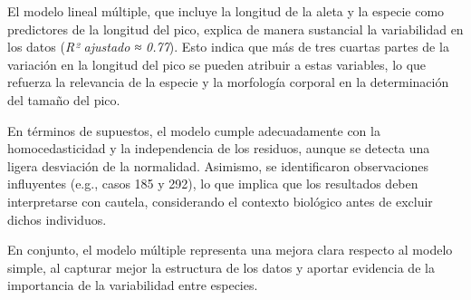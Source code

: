 \documentclass[
  spanish,
  11pt,
  a4paper,
  DIV=11,
  numbers=noendperiod]{scrartcl}
\begin{document}
El modelo lineal múltiple, que incluye la longitud de la aleta y la
especie como predictores de la longitud del pico, explica de manera
sustancial la variabilidad en los datos (\emph{R² ajustado ≈ 0.77}).
Esto indica que más de tres cuartas partes de la variación en la
longitud del pico se pueden atribuir a estas variables, lo que refuerza
la relevancia de la especie y la morfología corporal en la determinación
del tamaño del pico.

En términos de supuestos, el modelo cumple adecuadamente con la
homocedasticidad y la independencia de los residuos, aunque se detecta
una ligera desviación de la normalidad. Asimismo, se identificaron
observaciones influyentes (e.g., casos 185 y 292), lo que implica que
los resultados deben interpretarse con cautela, considerando el contexto
biológico antes de excluir dichos individuos.

En conjunto, el modelo múltiple representa una mejora clara respecto al
modelo simple, al capturar mejor la estructura de los datos y aportar
evidencia de la importancia de la variabilidad entre especies.
\end{document}
